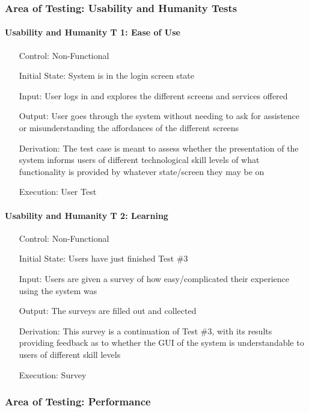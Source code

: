 \documentclass[12pt, titlepage]{article}
\begin{document}
\subsubsection{Area of Testing: Usability and Humanity Tests}

\paragraph*{Usability and Humanity T 1: Ease of Use}
\begin{itemize}
	\item[Control:] Non-Functional
	\item[Initial State:] System is in the login screen state
	\item[Input:] User logs in and explores the different screens and services offered
	\item[Output:] User goes through the system without needing to ask for assistence or misunderstanding the affordances of the different screens
	\item[Derivation:] The test case is meant to assess whether the presentation of the system informs users of different technological skill levels of what functionality is provided by whatever state/screen they may be on
	\item[Execution:] User Test
\end{itemize}

\paragraph*{Usability and Humanity T 2: Learning}
\begin{itemize}
	\item[Control:] Non-Functional
	\item[Initial State:] Users have just finished Test \#3
	\item[Input:] Users are given a survey of how easy/complicated their experience using the system was
	\item[Output:] The surveys are filled out and collected
	\item[Derivation:] This survey is a continuation of Test \#3, with its results providing feedback as to whether the GUI of the system is understandable to users of different skill levels
	\item[Execution:] Survey
\end{itemize}

\subsubsection{Area of Testing: Performance}
\end{document}

